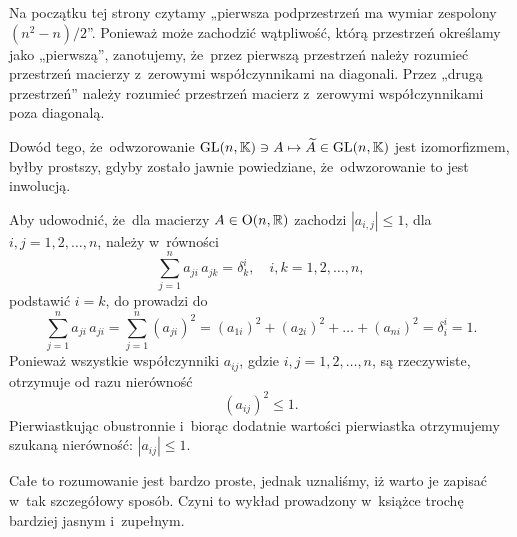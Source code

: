\documentclass[a4paper,11pt]{article}
\begin{document}
\start {} Na początku tej strony czytamy „pierwsza podprzestrzeń ma
wymiar zespolony $( n^{ 2 } - n ) / 2$”. Ponieważ może zachodzić wątpliwość,
którą przestrzeń określamy jako „pierwszą”, zanotujemy, że~przez pierwszą
przestrzeń należy rozumieć przestrzeń macierzy z~zerowymi współczynnikami na
diagonali. Przez „drugą przestrzeń” należy rozumieć przestrzeń macierz
z~zerowymi współczynnikami poza diagonalą.

\vspace{\spaceFour}





\start {} Dowód tego, że~odwzorowanie
$\mathrm{GL}( n, \mathbb{K} ) \ni A \mapsto \widetilde{A} \in \mathrm{GL}( n, \mathbb{K} )$ jest izomorfizmem,
byłby prostszy, gdyby zostało jawnie powiedziane, że~odwzorowanie to jest
inwolucją.

\vspace{\spaceFour}





\start {} Aby udowodnić, że~dla macierzy
$A \in \mathbf{\mathrm{O}}( n, \mathbb{R} )$ zachodzi $| a_{ i, j } | \leq 1$, dla
$i, j = 1, 2, \ldots, n$, należy w~równości
\begin{equation}
  \label{eq:Wojtynski-04}
  \sum_{ j = 1 }^{ n } a_{ j i } \, a_{ j k } = \delta_{ k }^{ i }, \quad
  i, k = 1, 2, \ldots, n,
\end{equation}
podstawić $i = k$, do prowadzi do
\begin{equation}
  \label{eq:Wojtynski-05}
  \sum_{ j = 1 }^{ n } a_{ j i } \, a_{ j i } =
  \sum_{ j = 1 }^{ n } ( a_{ j i } )^{ 2 } =
  ( a_{ 1 i } )^{ 2 } + ( a_{ 2 i } )^{ 2 } + \ldots + ( a_{ n i } )^{ 2 } =
  \delta^{ i }_{ i } = 1.
\end{equation}
Ponieważ wszystkie współczynniki $a_{ i j }$, gdzie $i, j = 1, 2, \ldots, n$, są
rzeczywiste, otrzymuje od razu nierówność
\begin{equation}
  \label{eq:Wojtynski-06}
  ( a_{ i j } )^{ 2 } \leq 1.
\end{equation}
Pierwiastkując obustronnie i~biorąc dodatnie wartości pierwiastka
otrzymujemy szukaną nierówność: $| a_{ i j } | \leq 1$.

Całe to rozumowanie jest bardzo proste, jednak uznaliśmy, iż warto je
zapisać w~tak szczegółowy sposób. Czyni to wykład prowadzony w~książce
trochę bardziej jasnym i~zupełnym.

\vspace{\spaceFour}
\end{document}
